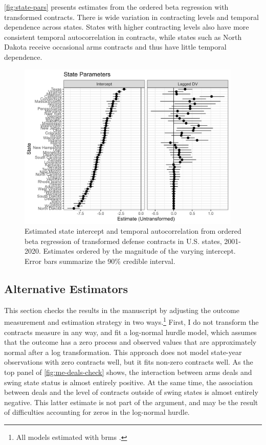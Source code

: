 \documentclass[12pt]{article}
\begin{document}
\autoref{fig:state-pars} presents estimates from the ordered beta regression with transformed contracts. 
There is wide variation in contracting levels and temporal dependence across states. 
States with higher contracting levels also have more consistent temporal autocorrelation in contracts, while states such as North Dakota receive occasional arms contracts and thus have little temporal dependence. 

\begin{figure}[htpb]
	\centering
		\includegraphics[width=0.95\textwidth]{state-pars.png}
	\caption{Estimated state intercept and temporal autocorrelation from ordered beta regression of transformed defense contracts in U.S. states, 2001-2020. Estimates ordered by the magnitude of the varying intercept. Error bars summarize the 90\% credible interval.}
	\label{fig:state-pars}
\end{figure}


\subsection{Alternative Estimators}

This section checks the results in the manuscript by adjusting the outcome measurement and estimation strategy in two ways.\footnote{All models estimated with brms \citep{Buerkner2017}.} 
First, I do not transform the contracts measure in any way, and fit a log-normal hurdle model, which assumes that the outcome has a zero process and observed values that are approximately normal after a log transformation. 
This approach does not model state-year observations with zero contracts well, but it fits non-zero contracts well. 
As the top panel of \autoref{fig:me-deals-check} shows, the interaction between arms deals and swing state status is almost entirely positive.
At the same time, the association between deals and the level of contracts outside of swing states is almost entirely negative. 
This latter estimate is not part of the argument, and may be the result of difficulties accounting for zeros in the log-normal hurdle. 
 
\end{document}
